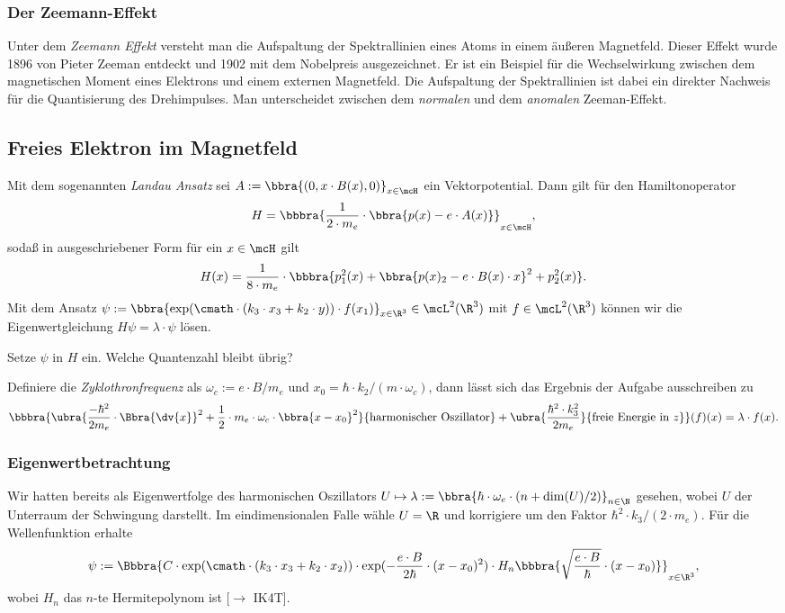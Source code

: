 \documentclass{subfiles}
\begin{document}

    \subsubsection{Der Zeemann-Effekt}
        Unter dem \emph{Zeemann Effekt} versteht man die Aufspaltung der Spektrallinien eines Atoms in einem äußeren Magnetfeld. Dieser Effekt wurde 1896 von Pieter Zeeman entdeckt und 1902 mit dem Nobelpreis ausgezeichnet. Er ist ein Beispiel für die Wechselwirkung zwischen dem magnetischen Moment eines Elektrons und einem externen Magnetfeld. Die Aufspaltung der Spektrallinien ist dabei ein direkter Nachweis für die Quantisierung des Drehimpulses. Man unterscheidet zwischen dem \emph{normalen} und dem \emph{anomalen} Zeeman-Effekt. 

    \subsection{Freies Elektron im Magnetfeld}

        Mit dem sogenannten \emph{Landau Ansatz} sei $A:=\bbra{(0,x\cdot B(x),0)}_{x\in\mcH}$ ein Vektorpotential. Dann gilt für den Hamiltonoperator 
        \[
            H = \bbbra{\frac{1}{2\cdot m_e}\cdot\bbra{p(x) - e\cdot A(x)}}_{x\in\mcH},
        \]
        sodaß in ausgeschriebener Form für ein $x\in\mcH$ gilt
        \[
            H(x) = \frac{1}{8\cdot m_e}\cdot \bbbra{p_1^2(x) + \bbra{p(x)_2 - e\cdot B(x)\cdot x}^2 + p_2^2(x)}.
        \]
        Mit dem Ansatz $\psi:=\bbra{\exp(\cmath\cdot (k_3\cdot x_3 + k_2\cdot y))\cdot f(x_1)}_{x\in\R^3}\in\mcL^2(\R^3)$ mit $f\in\mcL^2(\R^3)$ können wir die Eigenwertgleichung $H\psi = \lambda\cdot\psi$ lösen.
        \begin{Aufgabe}
            \nr{} Setze $\psi$ in $H$ ein. Welche Quantenzahl bleibt übrig?
        \end{Aufgabe}
        Definiere die \emph{Zyklothronfrequenz} als $\omega_c:=e\cdot B/m_e$ und $x_0 = \hbar\cdot k_2/(m\cdot\omega_c)$, dann lässt sich das Ergebnis der Aufgabe ausschreiben zu 
        \[
            \bbbra{\ubra{\frac{-\hbar^2}{2m_e}\cdot \Bbra{\dv{x}}^2 + \frac{1}{2}\cdot m_e\cdot\omega_c\cdot\bbra{x-x_0}^2}{\text{harmonischer Oszillator}} + \ubra{\frac{\hbar^2\cdot k_3^2}{2m_e}}{\text{freie Energie in }z}}(f)(x) = \lambda\cdot f(x).
        \] 
        \subsubsection*{Eigenwertbetrachtung}
            Wir hatten bereits als Eigenwertfolge des harmonischen Oszillators $U\mapsto \lambda:=\bbra{\hbar\cdot\omega_e\cdot (n+\dim(U)/2)}_{n\in\N}$ gesehen, wobei $U$ der Unterraum der Schwingung darstellt. Im eindimensionalen Falle wähle $U = \R$ und korrigiere um den Faktor $\hbar^2\cdot k_3/(2\cdot m_e)$. Für die Wellenfunktion erhalte
            \[
                \psi := \Bbbra{C\cdot\exp(\cmath\cdot (k_3\cdot x_3 + k_2\cdot x_2))\cdot\exp(-\frac{e\cdot B}{2\hbar}\cdot (x-x_0)^2)\cdot H_n\bbbra{\sqrt{\frac{e\cdot B}{\hbar}}\cdot (x-x_0)}}_{x\in\R^3},
            \]
            wobei $H_n$ das $n$-te Hermitepolynom ist [$\to$ IK4T]. 
\end{document}

